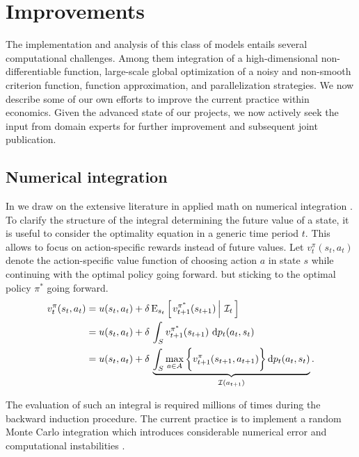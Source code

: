 \section{Improvements}\label{Computation}
The implementation and analysis of this class of models entails several computational challenges. Among them integration of a high-dimensional non-differentiable function, large-scale global optimization of a noisy and non-smooth criterion function, function approximation, and parallelization strategies. We now describe some of our own efforts to improve the current practice within economics. Given the advanced state of our projects, we now actively seek the input from domain experts for further improvement and subsequent joint publication.
\subsection{Numerical integration} In \citet{Gabler.2020a} we draw on the extensive literature in applied math on numerical integration \citep{Davis.2007}.\\

\noindent To clarify the structure of the integral determining the future value of a state, it is useful to consider the optimality equation in a generic time period $t$. This allows to focus on action-specific rewards instead of future values. Let $v^{\pi}_{t}(s_t, a_t)$ denote the action-specific value function of choosing action $a$ in state $s$ while continuing with the optimal policy going forward.
but sticking to the optimal policy $\pi^*$ going forward.
%
\begin{align}
v^{\pi}_{t}(s_t, a_t) & = u(s_t, a_t) + \delta\,\mathrm{E}_{s_t} \left[\left.v^{\pi^*}_{t + 1}(s_{t + 1})\,\right\vert\,\mathcal{I}_t\,\right] \\
& =  u(s_t, a_t) + \delta\, \int_S v^{\pi^*}_{t + 1}(s_{t + 1})\, \mathop{}\!\mathrm{d} p_t(a_t, s_t)\\
& =  u(s_t, a_t) + \delta\, \underbrace{\int_S \max_{a \in A}\bigg\{v^\pi_{t + 1}(s_{t + 1}, a_{t + 1})\bigg\}\mathop{}\!\mathrm{d} p_t(a_t, s_t)}_{\mathcal{I}(a_{t + 1})}.
\end{align}

\noindent The evaluation of such an integral is required millions of times during the backward induction procedure. The current practice is to implement a random Monte Carlo integration which introduces considerable numerical error and computational instabilities \citep{Judd.2011}.\\

